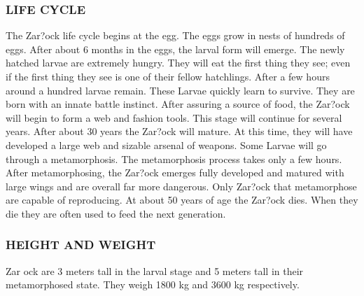 \subsubsection{LIFE CYCLE}
The Zar?ock life cycle begins at the egg.  The eggs grow in nests of hundreds
of eggs.  After about 6 months in the eggs, the larval form will emerge.  The
newly hatched larvae are extremely hungry.  They will eat the first thing they
see; even if the first thing they see is one of their fellow hatchlings.  After
a few hours around a hundred larvae remain.  These Larvae quickly learn to
survive.  They are born with an innate battle instinct.  After assuring a
source of food, the Zar?ock will begin to form a web and fashion tools.  This
stage will continue for several years.  After about 30 years the Zar?ock will
mature.  At this time, they will have developed a large web and sizable arsenal
of weapons.  Some Larvae will go through a metamorphosis.  The metamorphosis
process takes only a few hours.  After metamorphosing, the Zar?ock emerges
fully developed and matured with large wings and are overall far more
dangerous.  Only Zar?ock that metamorphose are capable of reproducing.  At
about 50 years of age the Zar?ock dies.  When they die they are often used to
feed the next generation.
\subsubsection{HEIGHT AND WEIGHT}
Zar ock are 3 meters tall in the larval stage and 5 meters tall in their
metamorphosed state.  They weigh 1800 kg and 3600 kg respectively.
